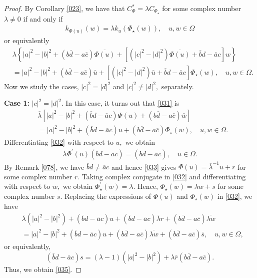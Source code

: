 \documentclass[10pt,a4paper]{amsart}
\begin{document}
\begin{proof}
By Corollary \ref{023}, we have that $C_{\Phi}^{\ast}=\lambda C_{\Phi_{\star}%
}$ for some complex number $\lambda\neq0$ if and only if
\begin{align*}
k_{\Phi(u)}(w)=\lambda k_{u}(\Phi_{\star}(w)),\quad u,w\in\Omega
\end{align*}
or equivalently
\begin{align}\label{031}
&  \lambda\left\{  |a|^{2}-|b|^{2}+(b\overline{d}-a\overline{c})\overline
{\Phi(u)}+[(|c|^{2}-|d|^{2})\overline{\Phi(u)}+\overline{b}d-\overline
{a}c]w\right\} \\
&  =|a|^{2}-|b|^{2}+(b\overline{d}-a\overline{c})\overline{u}+[(|c|^{2}%
-|d|^{2})\overline{u}+\overline{b}d-\overline{a}c]\Phi_{\star}(w),\quad
u,w\in\Omega.\nonumber
\end{align}
Now we study the cases, $|c|^{2}=|d|^{2}$ and $|c|^{2}\neq|d|^{2},$ separately.

\textbf{Case 1:} $|c|^{2}=|d|^{2}.$ \newline In this case, it turns out that
\eqref{031} is
\begin{align}\label{032}
&  \overline{\lambda}[  |a|^{2}-|b|^{2}+(\overline{b}d-\overline
{a}c)\Phi(u)+(b\overline{d}-a\overline{c})\overline{w}] \\
&  =|a|^{2}-|b|^{2}+(\overline{b}d-\overline{a}c)u+(b\overline{d}%
-a\overline{c})\overline{\Phi_{\star}(w)},\quad u,w\in\Omega.\nonumber
\end{align}
Differentiating \eqref{032} with respect to $u,$ we obtain
\begin{align}\label{033}
\overline{\lambda}\Phi^{\prime}(u)(\overline{b}d-\overline{a}c)=(\overline
{b}d-\overline{a}c),\quad u\in\Omega.
\end{align}
By Remark \ref{078}, we have $\overline{b}d\neq\overline{a}c$ and hence
\eqref{033} gives $\Phi(u)=\overline{\lambda}^{-1}u+r$ for some complex number
$r.$ Taking complex conjugate in \eqref{032} and differentiating with respect
to $w,$ we obtain $\Phi_{\star}^{\prime}(w)=\lambda.$ Hence, $\Phi_{\star
}(w)=\lambda w+s$ for some complex number $s.$ Replacing the expressions of
$\Phi(u)$ and $\Phi_{\star}(w)$ in \eqref{032}, we have
\begin{align*}
&  \overline{\lambda}(|a|^{2}-|b|^{2})+(\overline{b}d-\overline{a}%
c)u+(\overline{b}d-\overline{a}c)\overline{\lambda}r+(b\overline{d}%
-a\overline{c})\overline{\lambda w}\\
&  =|a|^{2}-|b|^{2}+(\overline{b}d-\overline{a}c)u+(b\overline{d}%
-a\overline{c})\overline{\lambda w}+(b\overline{d}-a\overline{c})\overline
{s},\quad u,w\in\Omega,
\end{align*}
or equivalently,
\[
(\overline{b}d-\overline{a}c)s
=(\lambda-1)(|a|^{2}-|b|^{2})+\lambda\overline{r}(b\overline
{d}-a\overline{c}).
\]
Thus, we obtain \eqref{035}.


\end{proof}
\end{document}
